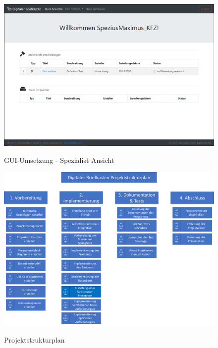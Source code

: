 \begin{figure}[h]
    \centering
    \begin{minipage}[t]{1\textwidth}
        \caption{GUI-Umsetzung - Spezialist Ansicht }
        \includegraphics[width=1\textwidth]{img/spezialist-umsetzung.png}\\
    \end{minipage}
\end{figure}

\pagebreak
\clearpage

\label{PSP}
\begin{figure}[h]
    \centering
    \begin{minipage}[t]{1\textwidth}
        \caption{Projektstrukturplan}
        \includegraphics[width=1\textwidth]{img/PSP.png}\\
    \end{minipage}
\end{figure}


